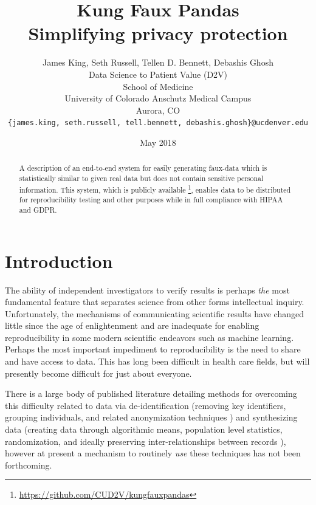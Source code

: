 \documentclass{article}
\title{%
  Kung Faux Pandas \\
  \large Simplifying privacy protection
  }
\author{
  James King, Seth Russell, Tellen D. Bennett, Debashis Ghosh\\
  Data Science to Patient Value (D2V)\\
  School of Medicine\\
  University of Colorado Anschutz Medical Campus\\
  Aurora, CO\\
  \texttt{\{james.king, seth.russell, tell.bennett, debashis.ghosh\}@ucdenver.edu}
  }
\date{May 2018}
\begin{document}

\maketitle

\begin{abstract}
A description of an end-to-end system for easily generating faux-data which is statistically similar to given real data but does not contain sensitive personal information. This system, which is publicly available \footnote{\url{https://github.com/CUD2V/kungfauxpandas}}, enables data to be distributed for reproducibility testing and other purposes while in full compliance with HIPAA and GDPR.
\end{abstract}


\section{Introduction}

The ability of independent investigators to verify results is perhaps \emph{the} most fundamental feature that separates science from other forms intellectual inquiry. Unfortunately, the mechanisms of communicating scientific results have changed little since the age of enlightenment and are inadequate for enabling reproducibility in some modern scientific endeavors such as machine learning. Perhaps the most important impediment to reproducibility is the need to share and have access to data. This has long been difficult in health care fields, but will presently become difficult for just about everyone.

There is a large body of published literature detailing methods for overcoming this difficulty related to data via de-identification (removing key identifiers, grouping individuals, and related anonymization techniques \cite{hippapro}) and synthesizing data (creating data through algorithmic means, population level statistics, randomization, and ideally preserving inter-relationships between records \cite{walonoski_synthea_2018, patki_synthetic_2016, choi_generating_2017}), however at present a mechanism to routinely \emph{use} these techniques has not been forthcoming.
\end{document}
